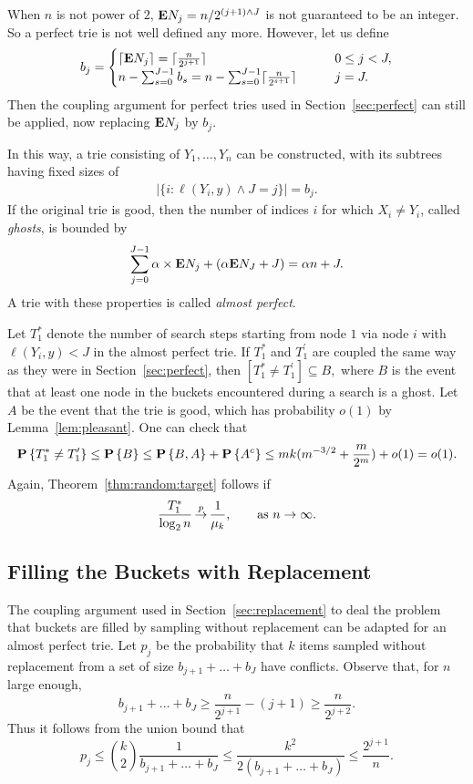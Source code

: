 \documentclass{article}
\newcommand{\Thead}{{T_1^\prime}}
\newcommand{\Th}{{{T}_1^*}}
\newcommand{\e}{{\textbf E}}
\newcommand{\p}[1]{{\textbf P}\left\{#1\right\}}
\newcommand\inprobHIGH{\,{\buildrel p \over \rightarrow}\,}
\newcommand\inprob{{\inprobHIGH}}
\begin{document}
When $n$ is not power of $2$, $\e N_j = n/2^{(j+1) \wedge J}$ is not guaranteed
to be an integer. So a perfect trie is not well defined 
any more.  However, let us define
$$
b_j =
\begin{cases}
    \lceil \e N_j \rceil 
    = \lceil \frac{n}{2^{j+1}} \rceil  & \qquad 0 \le j < J, \\
    n - \sum_{s=0}^{J-1} b_s = n - \sum_{s=0}^{J-1} \lceil \frac{n}{2^{s+1}}
    \rceil & \qquad j = J.
\end{cases}
$$
Then the coupling argument for perfect tries used in Section~\ref{sec:perfect}
can still be applied, now replacing $\e N_j$ by $b_j$.

In this way, a trie consisting of $Y_1,\ldots,Y_n$ can be constructed, with
its subtrees having fixed sizes of
\begin{align}
    |\{i:\ell(Y_i,y) \wedge J=j\}|
    = b_j.
    \label{eq:Y:almost}
\end{align}
If the original trie is good, then the number of indices $i$ for which $X_i \ne
Y_i$, called \emph{ghosts}, is
bounded by
\begin{align*}
    \sum_{j=0}^{J-1} \alpha \times \e N_j  + (\alpha \e N_J + J) = \alpha n + J.
\end{align*}
A trie with these properties is called \emph{almost perfect}.

Let $\Th$ denote the number of search steps starting from node $1$ via node $i$
with $\ell(Y_i,y) < J$ in the almost perfect trie. If $\Th$ and $\Thead$ are
coupled  the same way as they were in Section~\ref{sec:perfect}, then
$
\left[ \Th \ne \Thead \right] \subseteq B,
$
where $B$ is the event that at least one node in the buckets
encountered during a search is a ghost. Let $A$ be the event that the
trie is good, which has probability $o(1)$ by Lemma~\ref{lem:pleasant}.
One can check that
\begin{align*}
    \p{\Th \ne \Thead}
    \le \p{B}
    \le \p{B, A} + \p{A^c}
\le m k (m^{-3/2} + \frac{m}{2^{m}}) + o(1)
    = o(1).
\end{align*}
Again, Theorem~\ref{thm:random:target} follows if
$$
\frac {\Th} {\log_2 n} \inprob \frac 1 {\mu_k}, \qquad \text{as } n \to
\infty.
$$

\subsection{Filling the Buckets with Replacement}

The coupling argument used in Section~\ref{sec:replacement} to deal the problem
that buckets are filled by sampling without replacement can be adapted for an
almost perfect trie.  Let $p_j$ be the probability that $k$ items sampled
without replacement from a set of size $b_{j+1} + \dots + b_{J}$ have
conflicts. Observe that, for $n$ large enough,
$$
b_{j+1} + \dots + b_{J} \ge \frac{n}{2^{j+1}} - (j+1) \ge
\frac{n}{2^{j+2}}.
$$
Thus it follows from the union bound that
$$
p_j 
\le \binom {k}{2} \frac{1}{b_{j+1}+\dots+b_{J}} 
\le \frac{k^{2}}{2 (b_{j+1} + \dots + b_{J})}
\le \frac{2^{j+1}}{n}.
$$
\end{document}

